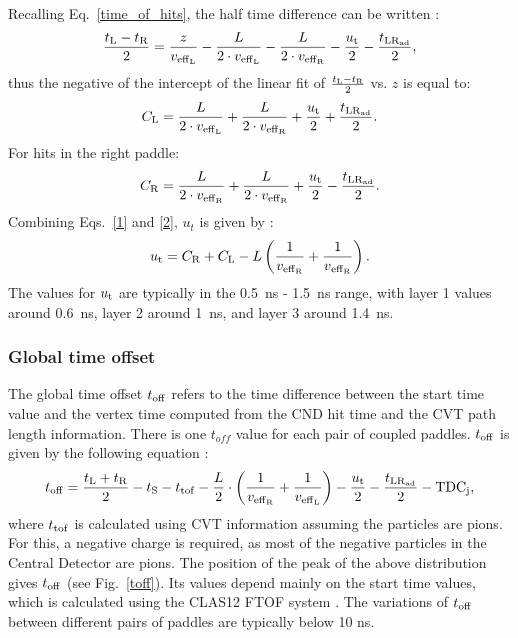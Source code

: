 Recalling Eq.~\ref{time_of_hits}, the half time difference can be written :
\begin{equation}
\frac{t_{\rm{L}}-t_{\rm{R}}}{2}=\frac{z}{v_{\rm{eff}_L}}-\frac{L}{2\cdot v_{\rm{eff}_{\rm{L}}}}-\frac{L}{2\cdot v_{\rm{eff}_{\rm{R}}}}-\frac{u_{\rm{t}}}{2}-\frac{t_{\rm{LR}_{\rm{ad}}}}{2},
\end{equation}
thus the negative of the intercept of the linear fit of $\frac{t_{\rm{L}}-t_{\rm{R}}}{2}$ vs. $z$ is equal to:
\begin{equation}
\label{1}
C_{\rm{L}}=\frac{L}{2\cdot v_{\rm{eff}_{\rm{L}}}}+\frac{L}{2\cdot v_{\rm{eff}_{\rm{R}}}}+\frac{u_{\rm{t}}}{2}+\frac{t_{\rm{LR}_{\rm{ad}}}}{2}.
\end{equation}
For hits in the right paddle:
\begin{equation}
\label{2}
C_{\rm{R}}=\frac{L}{2\cdot v_{\rm{eff}_{\rm{R}}}}+\frac{L}{2\cdot v_{\rm{eff}_{\rm{R}}}}+\frac{u_{\rm{t}}}{2}-\frac{t_{\rm{LR}_{\rm{ad}}}}{2}.
\end{equation}
Combining Eqs.~\ref{1} and \ref{2}, $u_t$ is given by :
\begin{equation}
u_{\rm{t}}=C_{\rm{R}}+C_{\rm{L}}-L \left(\frac{1}{v_{\rm{eff}_{\rm{R}}}}+\frac{1}{v{_{\rm{eff}_{\rm{R}}}}}\right).
\end{equation}
The values for $u_{\rm{t}}$ are typically in the 0.5~ns - 1.5~ns range, with layer 1 values around 0.6~ns, layer 2 around 1~ns, and layer 3 around 1.4~ns.

\subsubsection{Global time offset}

The global time offset $t_{\rm{off}}$ refers to the time difference between the start time value and the vertex time computed from the CND hit time and the CVT path length information. There is one $t_{off}$ value for each pair of coupled paddles.
$t_{\rm{off}}$ is given by the following equation :
\begin{equation}
t_{\rm{off}} = \frac{t_{\rm{L}}+t_{\rm{R}}}{2} - t_{\rm{S}} - t_{\rm{tof}}
                    - \frac{L}{2} \cdot \left(\frac{1}{v_{\rm{eff}_{\rm{R}}}} + \frac{1}{v_{\rm{eff}_L}}\right) - \frac{u_{\rm{t}}}{2} - \frac{t_{\rm{LR}_{\rm{ad}}}}{2}-{\rm{TDC}}_{\rm{j}},
\end{equation}
where $t_{\rm{tof}}$ is calculated using CVT information assuming the particles are pions. For this, a negative charge is required, as most of the negative particles in the Central Detector are pions. The position of the peak of the above distribution gives $t_{\rm{off}}$ (see Fig.~\ref{toff}). Its values depend mainly on the start time values, which is calculated using the CLAS12 FTOF system \cite{ftofref}. The variations of $t_{\rm{off}}$ between different pairs of paddles are typically below 10 ns.

